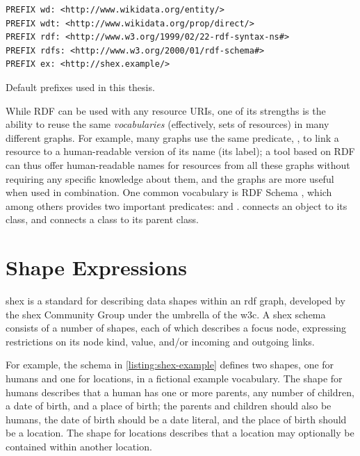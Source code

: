 \begin{lstfloat}
\begin{lstlisting}[language=sparql]
PREFIX wd: <http://www.wikidata.org/entity/>
PREFIX wdt: <http://www.wikidata.org/prop/direct/>
PREFIX rdf: <http://www.w3.org/1999/02/22-rdf-syntax-ns#>
PREFIX rdfs: <http://www.w3.org/2000/01/rdf-schema#>
PREFIX ex: <http://shex.example/>
\end{lstlisting}
\caption{Default prefixes used in this thesis.}
\label{listing:prefixes}
\end{lstfloat}

While RDF can be used with any resource URIs,
one of its strengths is the ability to reuse the same \emph{vocabularies}
(effectively, sets of resources)
in many different graphs.
For example, many graphs use the same predicate, ,
to link a resource to a human-readable version of its name (its label);
a tool based on RDF can thus offer human-readable names for resources from all these graphs
without requiring any specific knowledge about them,
and the graphs are more useful when used in combination.
One common vocabulary is RDF Schema \cite{Guha:14:RS}, %
which among others provides two important predicates:
 and .
 connects an object to its class,
and  connects a class to its parent class.


\section{Shape Expressions}
\label{sec:Background:ShEx}


\acrfull{shex} \cite{shex}
is a standard for describing data shapes within an \gls{rdf} graph,
developed by the \gls{shex} Community Group under the umbrella of the \gls{w3c}.
A \gls{shex} schema consists of a number of shapes,
each of which describes a focus node,
expressing restrictions on its node kind, value, and/or incoming and outgoing links.

For example, the schema in \cref{listing:shex-example} defines two shapes,
one for humans and one for locations,
in a fictional example vocabulary.
The shape for humans describes that a human has one or more parents,
any number of children,
a date of birth,
and a place of birth;
the parents and children should also be humans,
the date of birth should be a date literal,
and the place of birth should be a location.
The shape for locations describes that a location may optionally be contained within another location.

